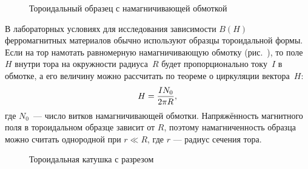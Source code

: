 


\begin{wrapfigure}{o}{0.35\textwidth}
    \centering
    \caption{Тороидальный образец с намагничивающей обмоткой}
\end{wrapfigure}

В лабораторных условиях для исследования зависимости $B(H)$ ферромагнитных
материалов обычно используют образцы тороидальной формы. Если на тор намотать
равномерную намагничивающую обмотку (рис.~), то поле~$H$ внутри
тора на окружности радиуса~$R$ будет пропорционально току~$I$ в обмотке, а его
величину можно рассчитать по теореме о циркуляции вектора~$H$:
\begin{equation}
    \eqmark{H-toroid}
    H = \frac{IN_0}{2\pi R},
\end{equation}
где $N_0$~--- число витков намагничивающей обмотки. Напряжённость магнитного
поля в тороидальном образце зависит от $R$, поэтому
намагниченность образца можно считать однородной при $r \ll R$, где $r$ ---
радиус сечения тора.


\begin{wrapfigure}{o}{0.35\textwidth}
    \centering
    \caption{Тороидальная катушка с разрезом}
\end{wrapfigure}

